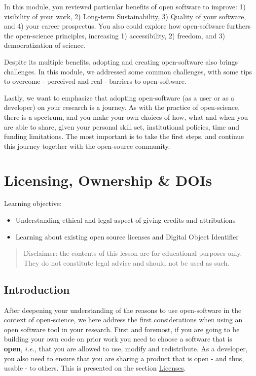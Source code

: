 \documentclass[
  letterpaper,
  DIV=11,
  numbers=noendperiod]{scrreport}
\providecommand{\tightlist}{%
  \setlength{\itemsep}{0pt}\setlength{\parskip}{0pt}}\usepackage{longtable,booktabs,array}
\begin{document}
In this module, you reviewed particular benefits of open software to
improve: 1) visibility of your work, 2) Long-term Sustainability, 3)
Quality of your software, and 4) your career prospectus. You also could
explore how open-software furthers the open-science principles,
increasing 1) accessibility, 2) freedom, and 3) democratization of
science.

Despite its multiple benefits, adopting and creating open-software also
brings challenges. In this module, we addressed some common challenges,
with some tips to overcome - perceived and real - barriers to
open-software.

Lastly, we want to emphasize that adopting open-software (as a user or
as a developer) on your research is a journey. As with the practice of
open-science, there is a spectrum, and you make your own choices of how,
what and when you are able to share, given your personal skill set,
institutional policies, time and funding limitations. The most important
is to take the first steps, and continue this journey together with the
open-source community.

\hypertarget{licensing-ownership-dois}{%
\chapter{Licensing, Ownership \& DOIs}\label{licensing-ownership-dois}}

Learning objective:

\begin{itemize}
\tightlist
\item
  Understanding ethical and legal aspect of giving credits and
  attributions
\item
  Learning about existing open source licenses and Digital Object
  Identifier
\end{itemize}

\begin{quote}
Disclaimer: the contents of this lesson are for educational purposes
only. They do not constitute legal advice and should not be used as
such.
\end{quote}

\hypertarget{introduction-6}{%
\section{Introduction}\label{introduction-6}}

After deepening your understanding of the reasons to use open-software
in the context of open-science, we here address the first considerations
when using an open software tool in your research. First and foremost,
if you are going to be building your own code on prior work you need to
choose a software that is \textbf{open}, \emph{i.e.,} that you are
allowed to use, modify and redistribute. As a developer, you also need
to ensure that you are sharing a product that is open - and thus, usable
- to others. This is presented on the section \href{link}{Licenses}.
\end{document}

